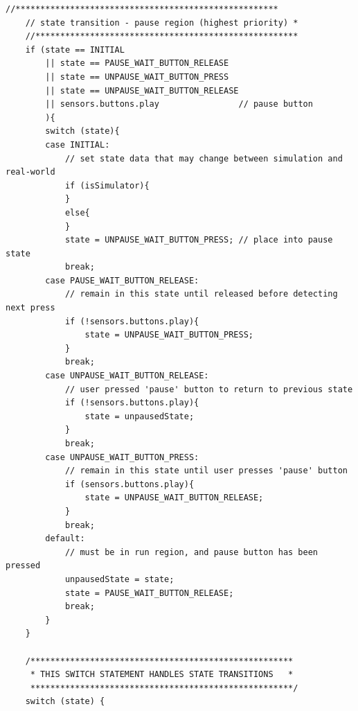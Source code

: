 \documentclass[twoside]{article}
\begin{document}
\begin{lstlisting}[mathescape, frame=single]
    //*****************************************************
    // state transition - pause region (highest priority) *
    //*****************************************************
    if (state == INITIAL
        || state == PAUSE_WAIT_BUTTON_RELEASE
        || state == UNPAUSE_WAIT_BUTTON_PRESS
        || state == UNPAUSE_WAIT_BUTTON_RELEASE
        || sensors.buttons.play                // pause button
        ){
        switch (state){
        case INITIAL:
            // set state data that may change between simulation and real-world
            if (isSimulator){
            }
            else{
            }
            state = UNPAUSE_WAIT_BUTTON_PRESS; // place into pause state
            break;
        case PAUSE_WAIT_BUTTON_RELEASE:
            // remain in this state until released before detecting next press
            if (!sensors.buttons.play){
                state = UNPAUSE_WAIT_BUTTON_PRESS;
            }
            break;
        case UNPAUSE_WAIT_BUTTON_RELEASE:
            // user pressed 'pause' button to return to previous state
            if (!sensors.buttons.play){
                state = unpausedState;
            }
            break;
        case UNPAUSE_WAIT_BUTTON_PRESS:
            // remain in this state until user presses 'pause' button
            if (sensors.buttons.play){
                state = UNPAUSE_WAIT_BUTTON_RELEASE;
            }
            break;
        default:
            // must be in run region, and pause button has been pressed
            unpausedState = state;
            state = PAUSE_WAIT_BUTTON_RELEASE;
            break;
        }
    }

    /*****************************************************
     * THIS SWITCH STATEMENT HANDLES STATE TRANSITIONS   *
     *****************************************************/
    switch (state) {


\end{lstlisting}
\end{document}
